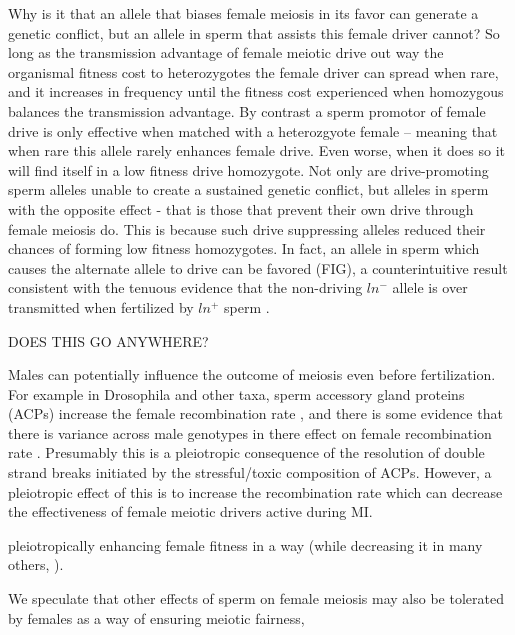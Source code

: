 \documentclass[12pt,letterpaper]{article}
\newcommand{\yb}[1]{{ \color{blue} #1}}
\begin{document}
Why is it that an allele that biases female meiosis in its favor can generate a genetic conflict, but an allele in sperm that assists this female driver cannot? 
So long as the transmission advantage of female meiotic drive out way the organismal fitness cost to heterozygotes the female driver can spread when rare, and it increases in 		
	frequency until the fitness cost experienced when homozygous balances the transmission advantage.
By contrast a sperm promotor of female drive is only effective when matched with a heterozgyote female -- meaning that when rare this allele rarely enhances female drive. 
Even worse, when it does so it will find itself in a low fitness drive homozygote. 
Not only are drive-promoting sperm alleles unable to create a sustained genetic conflict, 
	but alleles in sperm with the opposite effect - that is those that prevent their own drive through female meiosis do.
This is because such drive suppressing alleles reduced their chances of forming  low fitness homozygotes.
In fact, an allele in sperm which causes the alternate allele to drive can be favored (FIG), a counterintuitive result 
	consistent with the tenuous evidence that the non-driving
        $ln^-$ allele is over transmitted when fertilized by $ln^+$
        sperm \cite{agulnick, Pomiankowski1993}. 

\yb{DOES THIS GO ANYWHERE? }

Males can potentially influence the outcome of meiosis even before
fertilization. 
For example in Drosophila and other taxa, sperm accessory
        gland proteins (ACPs) increase the female recombination rate
        \cite{SOMEthING}, and there is some evidence that there is
        variance across male genotypes in there effect on female
        recombination rate \cite{Stevison2012}.
Presumably this is a pleiotropic consequence of the resolution of double strand breaks initiated by the stressful/toxic composition of ACPs. 
However, a pleiotropic effect of this is to increase the recombination
rate which can decrease the effectiveness of female meiotic drivers
active during MI. 

 
	pleiotropically enhancing female fitness in a way (while
        decreasing it in many others, \cite{Partridge and Hurst}). 

 We speculate that other effects of sperm on female meiosis may also be tolerated by females as a way of ensuring meiotic fairness, 



  
\end{document}
